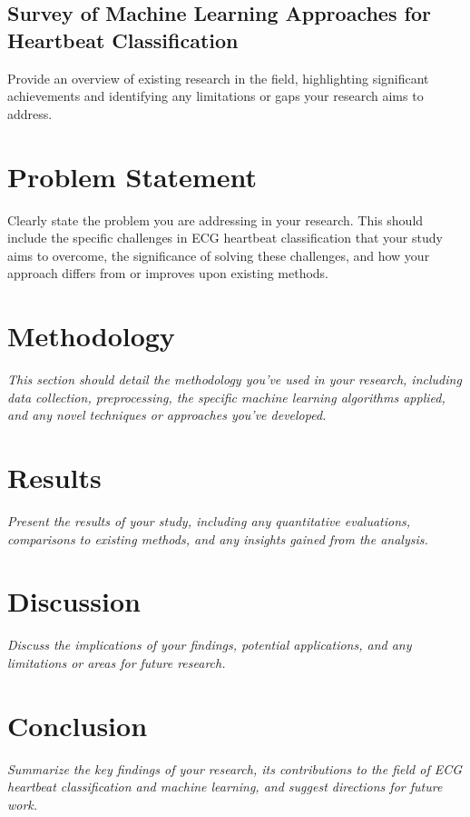 \documentclass[conference]{IEEEtran}
\begin{document}
\subsection{Survey of Machine Learning Approaches for Heartbeat Classification}
Provide an overview of existing research in the field, highlighting significant achievements and identifying any limitations or gaps your research aims to address.

\section{Problem Statement}
Clearly state the problem you are addressing in your research. This should include the specific challenges in ECG heartbeat classification that your study aims to overcome, the significance of solving these challenges, and how your approach differs from or improves upon existing methods.

\section{Methodology}
\textit{This section should detail the methodology you've used in your research, including data collection, preprocessing, the specific machine learning algorithms applied, and any novel techniques or approaches you've developed.}

\section{Results}
\textit{Present the results of your study, including any quantitative evaluations, comparisons to existing methods, and any insights gained from the analysis.}

\section{Discussion}
\textit{Discuss the implications of your findings, potential applications, and any limitations or areas for future research.}

\section{Conclusion}
\textit{Summarize the key findings of your research, its contributions to the field of ECG heartbeat classification and machine learning, and suggest directions for future work.}
\end{document}
